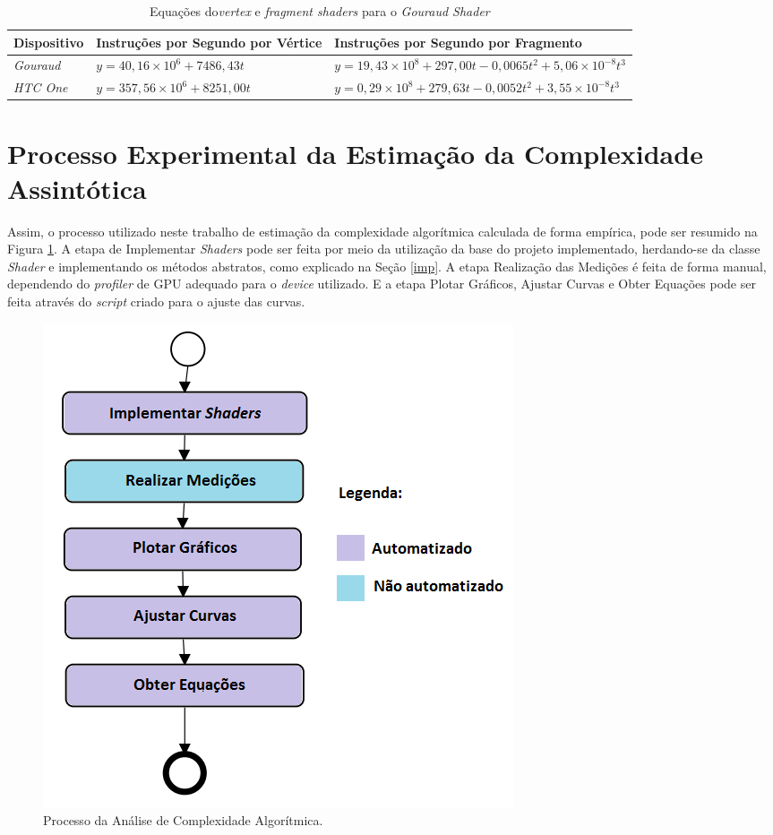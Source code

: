 	\begin{table}[ht]
	\centering	
	\begin{tabularx}{0.9\textwidth}{lXX}
		\toprule
		\textbf{Dispositivo} & \textbf{Instruções por Segundo por Vértice} & \textbf{Instruções por Segundo por Fragmento}  \\
		\midrule
		\textit{Gouraud} & $y = 40,16 \times 10^6 + 7486,43t$ & $y = 19,43 \times 10 ^8 + 297,00t - 0,0065t^2 + 5,06 \times 10^{-8}t^3 $  \\
		\textit{HTC One} & $y = 357,56 \times 10^6 + 8251,00t$ & $y = 0,29 \times 10 ^8 + 279,63t - 0,0052t^2 + 3,55 \times 10^{-8}t^3 $  \\

		\bottomrule
	\end{tabularx}
	\caption{Equações do\textit{vertex} e \textit{fragment shaders} para o \textit{Gouraud Shader}}
	\label{vertex_frag_comp}
	\end{table}


\section{Processo Experimental da Estimação da Complexidade Assintótica}  

	Assim, o processo utilizado neste trabalho de estimação da complexidade algorítmica calculada de forma empírica, pode ser resumido na Figura \ref{processo}. A etapa de Implementar \textit{Shaders} pode ser feita por meio da utilização da base do projeto implementado, herdando-se da classe \textit{Shader} e implementando os métodos abstratos, como explicado na Seção \ref{imp}. A etapa Realização das Medições é feita de forma manual, dependendo do \textit{profiler} de GPU adequado para o \textit{device} utilizado. E a etapa Plotar Gráficos, Ajustar Curvas e Obter Equações pode ser feita através do \textit{script} criado para o ajuste das curvas.

	\begin{figure}[ht]
	\centering
		\includegraphics[keepaspectratio=true,scale=0.5]{figuras/processo.png}
	\caption{Processo da Análise de Complexidade Algorítmica.}
	\label{processo}
	\end{figure}
